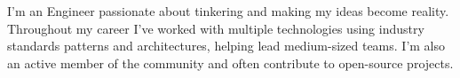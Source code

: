 \documentclass[letter,10pt]{article}
\begin{document}

I'm an Engineer passionate about tinkering and making my ideas become reality. Throughout my career I've worked with multiple technologies using industry standards patterns and architectures, helping lead medium-sized teams. I'm also an active member of the community and often contribute to open-source projects.
\end{document}
